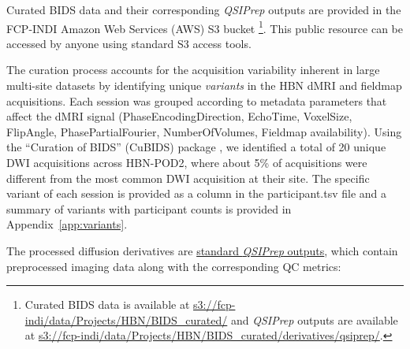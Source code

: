 \documentclass[fleqn,10pt,inline]{wlscirep}
\begin{document}
Curated BIDS data and their corresponding \emph{QSIPrep} outputs are provided in the FCP-INDI Amazon Web Services (AWS) S3 bucket
\footnote{%
    Curated BIDS data is available at 
    \url{s3://fcp-indi/data/Projects/HBN/BIDS_curated/}
    and \emph{QSIPrep} outputs are available at
    \url{s3://fcp-indi/data/Projects/HBN/BIDS_curated/derivatives/qsiprep/}.
}. This public resource can be accessed by anyone using standard S3 access tools.

The curation process accounts for the acquisition variability inherent in large multi-site datasets
by identifying unique \emph{variants} in the HBN 
dMRI and fieldmap acquisitions. Each session was grouped according to metadata parameters that
affect the dMRI signal (PhaseEncodingDirection, EchoTime, VoxelSize, FlipAngle, PhasePartialFourier,
NumberOfVolumes, Fieldmap availability). Using the ``Curation of BIDS'' (CuBIDS) package \cite{sydney-covitz2022-cubids}, we identified a total of 20 unique DWI acquisitions across
HBN-POD2, where about 5\% of acquisitions were different from the most common DWI acquisition at their
site. The specific variant of each session is provided as a column in the participant.tsv file and a summary of variants with participant counts is provided in Appendix~\ref{app:variants}.

The processed diffusion derivatives are \href{
https://qsiprep.readthedocs.io/en/latest/preprocessing.html#outputs-of-qsiprep}{
standard \emph{QSIPrep} outputs}, which contain preprocessed imaging data
along with the corresponding QC metrics:
\end{document}
